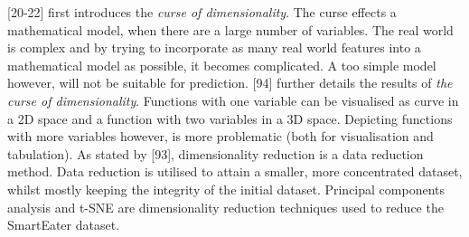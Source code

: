 \textcite{bellman1957dynamic}[20-22] first introduces the \textit{curse of dimensionality}. The curse effects a mathematical model, when there are a large number of variables. The real world is complex and by trying to incorporate as many real world features into a mathematical model as possible, it becomes complicated. A too simple model however, will not be suitable for prediction. 
\textcite{bellman1961adaptive}[94] further details the results of \textit{the curse of dimensionality}. Functions with one variable can be visualised as curve in a 2D space and a function with two variables in a 3D space. Depicting functions with more variables however, is more problematic (both for visualisation and tabulation). As stated by \textcite{han2011data}[93], dimensionality reduction is a data reduction method. Data reduction is utilised to attain a smaller, more concentrated dataset, whilst mostly keeping the integrity of the initial dataset. Principal components analysis and t-SNE are dimensionality reduction techniques used to reduce the SmartEater dataset.











